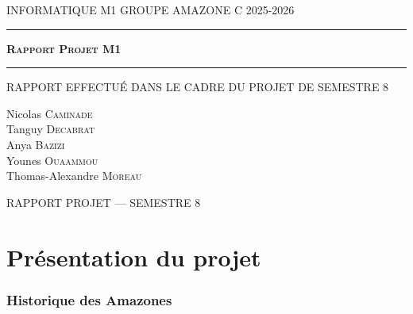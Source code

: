 \documentclass[12pt,a4paper,titlepage,oneside]{article}
\begin{document}
    \begin{titlepage}
        \selectfont
        \begin{center}\normalsize
            \MakeUppercase{Informatique M1 \hfill Groupe Amazone C \hfill 2025-2026}
        \end{center}
        \vspace*{0.1cm}
        \hrule
        \vspace*{0.2cm}
        \vspace*{2cm}
        \begin{center}\Huge
            \textsc{\textbf{Rapport Projet M1}}
        \end{center}
        \hrule
        \begin{center}
            \MakeUppercase{Rapport effectué dans le cadre du projet de semestre 8}
        \end{center}
        \vspace*{2cm}
        \begin{center}\Large
            Nicolas \textsc{Caminade}\\ \vspace{0.3cm}
            Tanguy \textsc{Decabrat}\\ \vspace{0.3cm}
            Anya \textsc{Bazizi}\\ \vspace{0.3cm}
            Younes \textsc{Ouaammou}\\ \vspace{0.3cm}
            Thomas-Alexandre \textsc{Moreau}
        \end{center}
        \vfill
        \begin{center}\normalsize
            \MakeUppercase{Rapport Projet --- Semestre 8}
        \end{center}
    \end{titlepage}

    \newpage
    \renewcommand{\contentsname}{Sommaire}
    \setcounter{tocdepth}{1} 
    \tableofcontents
    \newpage

    \markboth{}{} 
    \normalsize

    \setcounter{part}{0}

    \part{Présentation du projet}
\section{Historique des Amazones}
\end{document}

